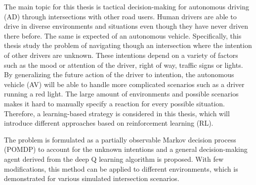 The main topic for this thesis is tactical decision-making for autonomous driving (AD) through intersections with other road users. Human drivers are able to drive in diverse environments and situations even though they have never driven there before. The same is expected of an autonomous vehicle. Specifically, this thesis study the problem of navigating though an intersection where the intention of other drivers are unknown. These intentions depend on a variety of factors such as the mood or attention of the driver, right of way, traffic signs or lights. By generalizing the future action of the driver to intention, the autonomous vehicle (AV) will be able to handle more complicated scenarios such as a driver running a red light. 
The large amount of environments and possible scenarios makes it hard to manually specify a reaction for every possible situation.
Therefore, a learning-based strategy is considered in this thesis, which will introduce different approaches based on reinforcement learning (RL). 

The problem is formulated as a partially observable Markov decision process (POMDP) to account for the unknown intentions and a general decision-making agent derived from the deep Q learning algorithm is proposed. With few modifications, this method can be applied to different environments, which is demonstrated for various simulated intersection scenarios. 



